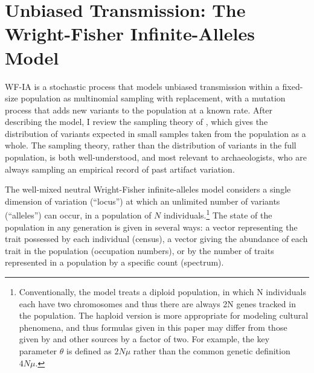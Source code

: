 \section{Unbiased Transmission:  The Wright-Fisher Infinite-Alleles Model}
\label{sec:wf-model}

WF-IA is a stochastic process that models unbiased transmission within a fixed-size population as multinomial sampling with replacement, with a mutation process that adds new variants to the population at a known rate.  After describing the model, I review the sampling theory of \citet{ewens1972sampling}, which gives the distribution of variants expected in small samples taken from the population as a whole.  The sampling theory, rather than the distribution of variants in the full population, is both well-understood, and most relevant to archaeologists, who are always sampling an empirical record of past artifact variation.

The well-mixed neutral Wright-Fisher infinite-alleles model \citep{kimura1964number} considers a single dimension of variation (``locus'') at which an unlimited number of variants (``alleles'') can occur, in a population of $N$ individuals.\footnote{Conventionally, the model treats a diploid population, in which N individuals each have two chromosomes and thus there are always 2N genes tracked in the population.  The haploid version is more appropriate for modeling cultural phenomena, and thus formulas given in this paper may differ from those given by \citet{Ewens2004} and other sources by a factor of two.  For example, the key parameter $\theta$ is defined as $2N\mu$ rather than the common genetic definition $4N\mu$.}  The state of the population in any generation is given in several ways:  a vector representing the trait possessed by each individual (census), a vector giving the abundance of each trait in the population (occupation numbers), or by the number of traits represented in a population by a specific count (spectrum).  

